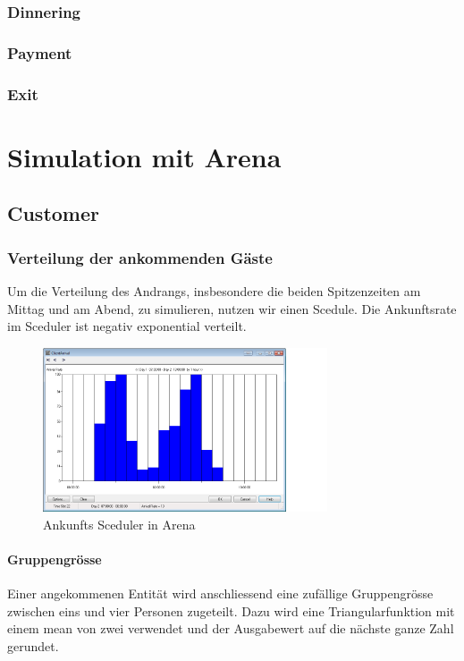 \documentclass[ngerman,a4paper,12pt]{scrreprt}
\begin{document}
\begin{landscape}
		\subsection{Dinnering}
		
		\subsection{Payment}
		
		\subsection{Exit}
		
		
\end{landscape}



\chapter{Simulation mit Arena}
	\section{Customer}			
		\subsection{Verteilung der ankommenden Gäste}
			Um die Verteilung des Andrangs, insbesondere die beiden Spitzenzeiten am Mittag und am Abend, zu simulieren, nutzen wir einen Scedule.	
			Die Ankunftsrate im Sceduler ist negativ exponential verteilt.
	
			\begin{figure}[H]
				\centering
					\includegraphics[width=0.75\textwidth]{img/scheduler.png}
					\caption[Arrival Sceduler in Arena]{Ankunfts Sceduler in Arena}
					\label{arrivalSceduler}
			\end{figure}
	
			\subsubsection{Gruppengrösse}
			Einer angekommenen Entität wird anschliessend eine zufällige Gruppengrösse zwischen eins und vier Personen zugeteilt. Dazu wird eine Triangularfunktion mit einem mean von zwei verwendet und der Ausgabewert auf die nächste ganze Zahl gerundet.
			
\end{document}
